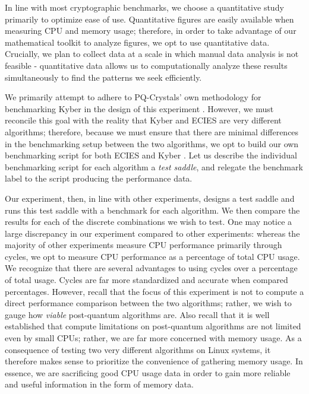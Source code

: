 \documentclass[a4paper]{article}
\begin{document}
In line with most cryptographic benchmarks, we choose a
quantitative study primarily to optimize ease of use. Quantitative
figures are easily available when measuring CPU and memory usage;
therefore, in order to take advantage of our mathematical toolkit to
analyze figures, we opt to use quantitative data. Crucially, we plan to
collect data at a scale in which manual data analysis is not feasible -
quantitative data allows us to computationally analyze these results
simultaneously to find the patterns we seek efficiently.

We primarily attempt to adhere to PQ-Crystals' own methodology
for benchmarking Kyber in the design of this experiment
\autocite{westerbaanX25519Kyber768Draft00HybridPostquantum2023}. However, we
must reconcile this goal with the reality that Kyber and ECIES are very
different algorithms; therefore, because we must ensure that there are
minimal differences in the benchmarking setup between the two
algorithms, we opt to build our own benchmarking script for both ECIES
and Kyber \autocite{liuIoTNUMSEvaluatingNUMS2019}. Let us describe the
individual benchmarking script for each algorithm a \emph{test saddle},
and relegate the benchmark label to the script producing the performance
data.

Our experiment, then, in line with other experiments, designs a test saddle and runs this test saddle with
a benchmark for each algorithm. We then compare the results for each of
the discrete combinations we wish to test. One may notice a large
discrepancy in our experiment compared to other experiments: whereas the
majority of other experiments measure CPU performance primarily through
cycles, we opt to measure CPU performance as a percentage of total CPU
usage. We recognize that there are several advantages to using cycles
over a percentage of total usage. Cycles are far more standardized and
accurate when compared percentages. However, recall that the focus of
this experiment is not to compute a direct performance comparison
between the two algorithms; rather, we wish to gauge how \emph{viable}
post-quantum algorithms are. Also recall that it is well established
that compute limitations on post-quantum algorithms are not limited even
by small CPUs; rather, we are far more concerned with memory usage. As a
consequence of testing two very different algorithms on Linux systems,
it therefore makes sense to prioritize the convenience of gathering
memory usage. In essence, we are sacrificing good CPU usage data in
order to gain more reliable and useful information in the form of memory
data.
\end{document}
